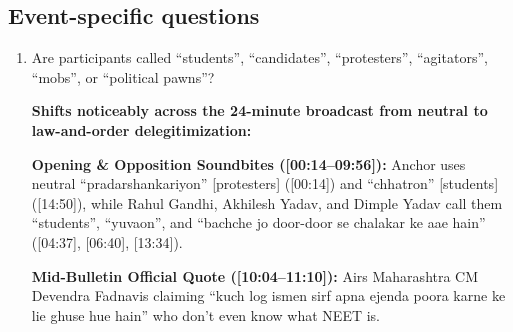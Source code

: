 \documentclass[10pt,a4paper]{article}
\begin{document}
\subsection*{Event-specific questions}
{\small
\begin{enumerate}[leftmargin=1.5em, itemsep=6pt, topsep=4pt]
  \item Are participants called ``students'', ``candidates'', ``protesters'', ``agitators'', ``mobs'', or ``political pawns''?\par\smallskip
  \textbf{Shifts noticeably across the 24-minute broadcast from neutral to law-and-order delegitimization:}

  \textbf{Opening \& Opposition Soundbites ([00:14--09:56]):} Anchor uses neutral ``pradarshankariyon'' [protesters] ([00:14]) and ``chhatron'' [students] ([14:50]), while Rahul Gandhi, Akhilesh Yadav, and Dimple Yadav call them ``students'', ``yuvaon'', and ``bachche jo door-door se chalakar ke aae hain'' ([04:37], [06:40], [13:34]).

  \textbf{Mid-Bulletin Official Quote ([10:04--11:10]):} Airs Maharashtra CM Devendra Fadnavis claiming ``kuch log ismen sirf apna ejenda poora karne ke lie ghuse hue hain'' who don't even know what NEET is.


\end{enumerate}}
\end{document}
